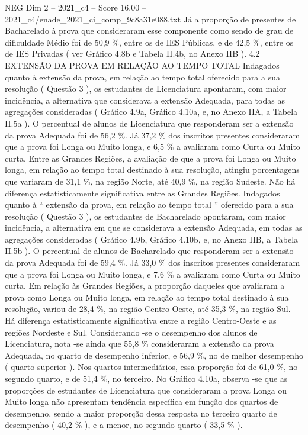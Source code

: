 \begin{textsample}{NEG Dim 2 – 2021\_c4 – Score 16.00 – 2021\_c4/enade\_2021\_ci\_comp\_9c8a31e088.txt}
Já a proporção de presentes de Bacharelado à prova que consideraram esse componente como sendo de grau de dificuldade Médio foi de 50,9 \%, entre os de IES Públicas, e de 42,5 \%, entre os de IES Privadas ( ver Gráfico 4.8b e Tabela II.4b, no Anexo IIB ). 4.2 EXTENSÃO DA PROVA EM RELAÇÃO AO TEMPO TOTAL Indagados quanto à extensão da prova, em relação ao tempo total oferecido para a sua resolução ( Questão 3 ), os estudantes de Licenciatura apontaram, com maior incidência, a alternativa que considerava a extensão Adequada, para todas as agregações consideradas ( Gráfico 4.9a, Gráfico 4.10a, e, no Anexo IIA, a Tabela II.5a ).
O percentual de alunos de Licenciatura que responderam ser a extensão da prova Adequada foi de 56,2 \%.
Já 37,2 \% dos inscritos presentes consideraram que a prova foi Longa ou Muito longa, e 6,5 \% a avaliaram como Curta ou Muito curta.
Entre as Grandes Regiões, a avaliação de que a prova foi Longa ou Muito longa, em relação ao tempo total destinado à sua resolução, atingiu porcentagens que variaram de 31,1 \%, na região Norte, até 40,9 \%, na região Sudeste.
Não há diferença estatisticamente significativa entre as Grandes Regiões.
Indagados quanto à “ extensão da prova, em relação ao tempo total ” oferecido para a sua resolução ( Questão 3 ), os estudantes de Bacharelado apontaram, com maior incidência, a alternativa em que se considerava a extensão Adequada, em todas as agregações consideradas ( Gráfico 4.9b, Gráfico 4.10b, e, no Anexo IIB, a Tabela II.5b ).
O percentual de alunos de Bacharelado que responderam ser a extensão da prova Adequada foi de 59,4 \%.
Já 33,0 \% dos inscritos presentes consideraram que a prova foi Longa ou Muito longa, e 7,6 \% a avaliaram como Curta ou Muito curta.
Em relação às Grandes Regiões, a proporção daqueles que avaliaram a prova como Longa ou Muito longa, em relação ao tempo total destinado à sua resolução, variou de 28,4 \%, na região Centro-Oeste, até 35,3 \%, na região Sul.
Há diferença estatisticamente significativa entre a região Centro-Oeste e as regiões Nordeste e Sul.
Considerando -se o desempenho dos alunos de Licenciatura, nota -se ainda que 55,8 \% consideraram a extensão da prova Adequada, no quarto de desempenho inferior, e 56,9 \%, no de melhor desempenho ( quarto superior ).
Nos quartos intermediários, essa proporção foi de 61,0 \%, no segundo quarto, e de 51,4 \%, no terceiro.
No Gráfico 4.10a, observa -se que as proporções de estudantes de Licenciatura que consideraram a prova Longa ou Muito longa não apresentam tendência específica em função dos quartos de desempenho, sendo a maior proporção dessa resposta no terceiro quarto de desempenho ( 40,2 \% ), e a menor, no segundo quarto ( 33,5 \% ).

\end{textsample}
